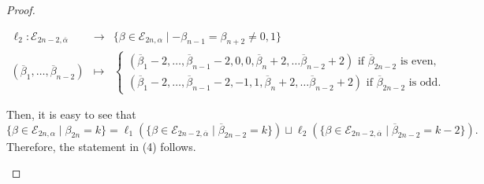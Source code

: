 \documentclass[11pt,oneside]{amsart}
\theoremstyle{plain}
\theoremstyle{definition}
\theoremstyle{remark}
\newcommand{\tx}[1]{\text{#1}}
\newcommand{\CE}{{\mathcal E}}
\numberwithin{equation}{section}
\begin{document}
\begin{proof}
\begin{enumerate}
			\begin{equation*}\begin{array}{ccl}
					\ell_2:\CE_{2n-2,\overline{\alpha}} & \rightarrow & \lbrace \beta \in \CE_{2n,\alpha} \mid -\beta_{n-1}=\beta_{n+2}\neq 0,1 \rbrace\\
					(\overline{\beta}_1,\dots,\overline{\beta}_{n-2}) & \mapsto & \left\lbrace \begin{array}{l}
						(\overline{\beta}_1-2,\dots,\overline{\beta}_{n-1}-2,0,0,\overline{\beta}_n+2,\dots\overline{\beta}_{n-2}+2) \tx{ if } \overline{\beta}_{2n-2} \tx{ is even},\\ (\overline{\beta}_1-2,\dots,\overline{\beta}_{n-1}-2,-1,1,\overline{\beta}_n+2,\dots\overline{\beta}_{n-2}+2) \tx{ if } \overline{\beta}_{2n-2} \tx{ is odd}.
					\end{array}\right.
				\end{array}
			\end{equation*}
			
			Then, it is easy to see that
			\begin{equation*}
				\lbrace \beta \in \CE_{2n,\alpha} \mid \beta_{2n}=k \rbrace=\ell_1( \lbrace \beta \in \CE_{2n-2,\overline{\alpha}} \mid \overline{\beta}_{2n-2}=k \rbrace) \sqcup \ell_2( \lbrace \beta \in \CE_{2n-2,\overline{\alpha}} \mid \overline{\beta}_{2n-2}=k-2 \rbrace).
			\end{equation*}
			Therefore, the statement in (4) follows.
		\end{enumerate}
	\end{proof}
	
\end{document}
